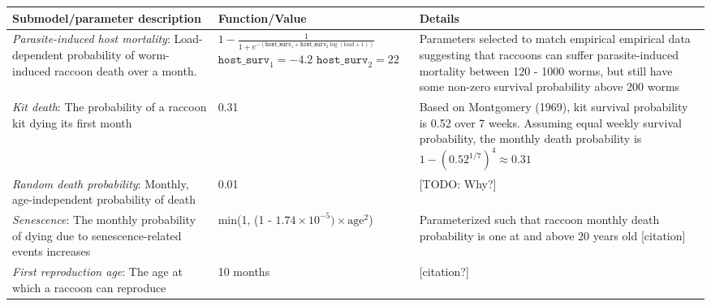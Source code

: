 \documentclass[11pt]{article}
\begin{document}






\clearpage

\linespread{1}
\scriptsize
\renewcommand{\arraystretch}{1.2}
\begin{longtable}{p{4.5cm} p{4.5cm} p{5cm}}
\toprule
\textbf{Submodel/parameter description} & \textbf{Function/Value} & \textbf{Details} \\
\midrule
\emph{Parasite-induced host mortality}: Load-dependent
probability of worm-induced raccoon death over a month. &
$1 - \frac{1}{1 + e^{-(\texttt{host\_surv}_1 + \texttt{host\_surv}_2 \log(\text{load} + 1))}}$ \newline\newline $\texttt{host\_surv}_1 = -4.2$ \newline $\texttt{host\_surv}_2 = 22$ & Parameters selected to match empirical empirical data suggesting that raccoons can suffer parasite-induced mortality between 120 - 1000 worms, but still have some non-zero survival probability above 200 worms \citep{Kazacos2001} \\
\hline
\emph{Kit death}: The probability of a raccoon kit dying its first month & 0.31 & Based on Montgomery (1969), kit survival probability is 0.52 over 7 weeks. Assuming equal weekly survival probability, the monthly death probability is $1 - (0.52^{1/7})^4 \approx 0.31$   \\
\hline
\emph{Random death probability}: Monthly, age-independent probability of death & 0.01 & [TODO: Why?] \\
\hline
\emph{Senescence}: The monthly probability of dying due to senescence-related events increases & min(1, (1 - $1.74\times10^{-5}) \times \text{age}^2$) & Parameterized such that raccoon monthly death probability is one at and above 20 years old [citation] \\
\hline
\emph{First reproduction age}: The age at which a raccoon can reproduce & 10 months & [citation?] \\

\end{longtable}
\end{document}
